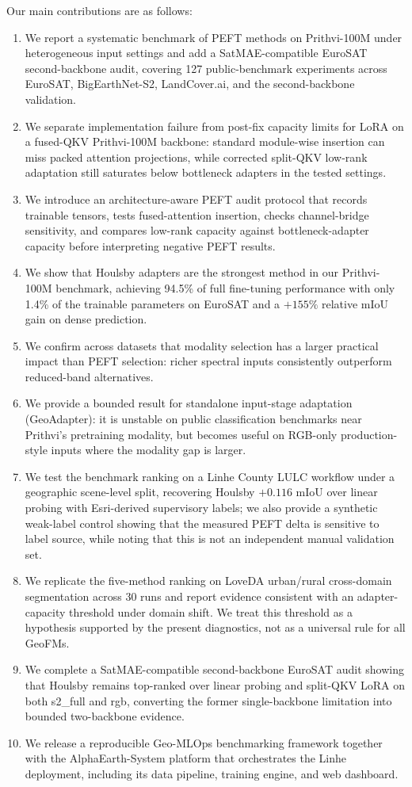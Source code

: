 Our main contributions are as follows:
\begin{enumerate}[leftmargin=1.5em]
    \item We report a systematic benchmark of PEFT methods on Prithvi-100M under heterogeneous input settings and add a SatMAE-compatible EuroSAT second-backbone audit, covering 127 public-benchmark experiments across EuroSAT, BigEarthNet-S2, LandCover.ai, and the second-backbone validation.
    \item We separate implementation failure from post-fix capacity limits for LoRA on a fused-QKV Prithvi-100M backbone: standard module-wise insertion can miss packed attention projections, while corrected split-QKV low-rank adaptation still saturates below bottleneck adapters in the tested settings.
    \item We introduce an architecture-aware PEFT audit protocol that records trainable tensors, tests fused-attention insertion, checks channel-bridge sensitivity, and compares low-rank capacity against bottleneck-adapter capacity before interpreting negative PEFT results.
    \item We show that Houlsby adapters are the strongest method in our Prithvi-100M benchmark, achieving 94.5\% of full fine-tuning performance with only 1.4\% of the trainable parameters on EuroSAT and a $+155\%$ relative mIoU gain on dense prediction.
    \item We confirm across datasets that modality selection has a larger practical impact than PEFT selection: richer spectral inputs consistently outperform reduced-band alternatives.
    \item We provide a bounded result for standalone input-stage adaptation (GeoAdapter): it is unstable on public classification benchmarks near Prithvi's pretraining modality, but becomes useful on RGB-only production-style inputs where the modality gap is larger.
    \item We test the benchmark ranking on a Linhe County LULC workflow under a geographic scene-level split, recovering Houlsby $+0.116$ mIoU over linear probing with Esri-derived supervisory labels; we also provide a synthetic weak-label control showing that the measured PEFT delta is sensitive to label source, while noting that this is not an independent manual validation set.
    \item We replicate the five-method ranking on LoveDA urban/rural cross-domain segmentation across 30 runs and report evidence consistent with an adapter-capacity threshold under domain shift. We treat this threshold as a hypothesis supported by the present diagnostics, not as a universal rule for all GeoFMs.
    \item We complete a SatMAE-compatible second-backbone EuroSAT audit showing that Houlsby remains top-ranked over linear probing and split-QKV LoRA on both s2\_full and rgb, converting the former single-backbone limitation into bounded two-backbone evidence.
    \item We release a reproducible Geo-MLOps benchmarking framework together with the AlphaEarth-System platform that orchestrates the Linhe deployment, including its data pipeline, training engine, and web dashboard.
\end{enumerate}
